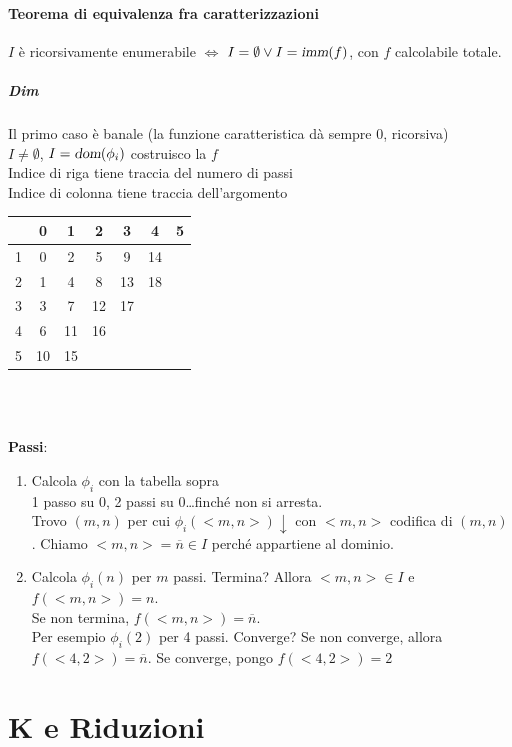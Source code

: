 \documentclass[10pt]{book}
\begin{document}
\paragraph{Teorema di equivalenza fra caratterizzazioni}
$I$ è ricorsivamente enumerabile $\Leftrightarrow$ $I = \emptyset \vee I = \textsl{imm}(f)$, con $f$ calcolabile totale.
\begin{multicols}{2}
\subparagraph{Dim} Il primo caso è banale (la funzione caratteristica dà sempre 0, ricorsiva)\\
$I \neq \emptyset$, $I = \textsl{dom}(\phi_i)$ costruisco la $f$\\
Indice di riga tiene traccia del numero di passi\\
Indice di colonna tiene traccia dell'argomento\\
\begin{tabular}{c || c | c | c | c | c | c}
	 & 0 & 1 & 2 & 3 & 4 & 5 \\
	 \hline
	 \hline
	 1 & 0 & 2 & 5 & 9 & 14 & \\
	 \hline
	 2 & 1 & 4 & 8 & 13 & 18 & \\
	 \hline
	 3 & 3 & 7 & 12 & 17 & & \\
	 \hline
	 4 & 6 & 11 & 16 & & & \\
	 \hline
	 5 & 10 & 15 & & & &
	\end{tabular}\\\\
\end{multicols}
\textbf{Passi}:
\begin{enumerate}
	\item Calcola $\phi_i$ con la tabella sopra\\
	1 passo su 0, 2 passi su 0\ldots finché non si arresta.\\
	Trovo $(m, n)$ per cui $\phi_i(<m, n>)\downarrow$ con $<m, n>$ codifica di $(m, n)$. Chiamo $<m, n> = \overline{n} \in I$ perché appartiene al dominio.
	 \item Calcola $\phi_i(n)$ per $m$ passi. Termina? Allora $<m, n> \in I$ e $f(<m, n>) = n$.\\
	 Se non termina, $f(<m, n>) = \overline{n}$.\\
	 Per esempio $\phi_i(2)$ per 4 passi. Converge? Se non converge, allora $f(<4, 2>) = \overline{n}$. Se converge, pongo $f(<4, 2>) = 2$
\end{enumerate}
\pagebreak
\section{K e Riduzioni}
\end{document}
